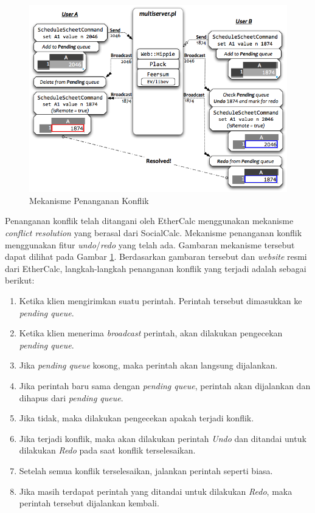 \begin{figure}[!htb]
    \centering
    \includegraphics[width=1\textwidth]{resources/chapter-3-conflict-res.png}
    \caption{Mekanisme Penanganan Konflik \citep{EtherCalc}}
	\label{MekanismeKonflik}
\end{figure}

Penanganan konflik telah ditangani oleh EtherCalc menggunakan mekanisme \textit{conflict resolution} yang berasal dari SocialCalc. Mekanisme penanganan konflik menggunakan fitur \textit{undo}/\textit{redo} yang telah ada. Gambaran mekanisme tersebut dapat dilihat pada Gambar \ref{MekanismeKonflik}. Berdasarkan gambaran tersebut dan \textit{website} resmi dari EtherCalc, langkah-langkah penanganan konflik yang terjadi adalah sebagai berikut:

\begin{enumerate}
	\item Ketika klien mengirimkan suatu perintah. Perintah tersebut dimasukkan ke \textit{pending queue}.
	\item Ketika klien menerima \textit{broadcast} perintah, akan dilakukan pengecekan \textit{pending queue}.
	\item Jika \textit{pending queue} kosong, maka perintah akan langsung dijalankan.
	\item Jika perintah baru sama dengan \textit{pending queue}, perintah akan dijalankan dan dihapus dari \textit{pending queue}.
	\item Jika tidak, maka dilakukan pengecekan apakah terjadi konflik.
	\item Jika terjadi konflik, maka akan dilakukan perintah \textit{Undo} dan ditandai untuk dilakukan \textit{Redo} pada saat konflik terselesaikan.
	\item Setelah semua konflik terselesaikan, jalankan perintah seperti biasa.
	\item Jika masih terdapat perintah yang ditandai untuk dilakukan \textit{Redo}, maka perintah tersebut dijalankan kembali.
\end{enumerate}

